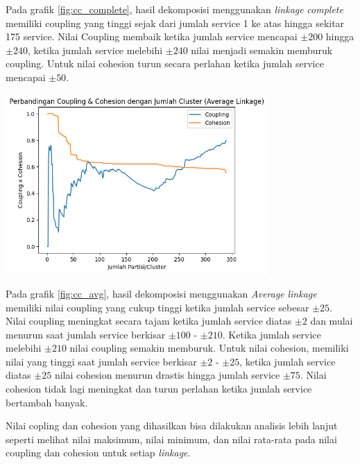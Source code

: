 Pada grafik \ref{fig:cc_complete}, hasil dekomposisi menggunakan \textit{linkage} \textit{complete} memiliki coupling yang tinggi sejak dari jumlah service 1 ke atas hingga sekitar 175 service. Nilai Coupling membaik ketika jumlah service mencapai   $\pm 200$  hingga  $\pm 240$, ketika jumlah service melebihi  $\pm 240$ nilai menjadi semakin memburuk coupling. Untuk nilai cohesion turun secara perlahan ketika jumlah service mencapai  $\pm 50$.

\begin{center}
	\includegraphics[width=10cm]{img/bab_4/cc_avg.png}
	\label{fig:cc_avg}
\end{center}

Pada grafik \ref{fig:cc_avg}, hasil dekomposisi menggunakan \textit{Average} \textit{linkage} memiliki nilai coupling yang cukup tinggi ketika jumlah service sebesar  $\pm 25$. Nilai coupling meningkat secara tajam ketika jumlah service diatas  $\pm 2$ dan mulai menurun saat jumlah service berkisar  $\pm 100$ - $\pm 210$. Ketika jumlah service melebihi  $\pm 210$ nilai coupling semakin memburuk. Untuk nilai cohesion, memiliki nilai yang tinggi saat jumlah service berkisar  $\pm 2$ -  $\pm 25$, ketika jumlah service diatas  $\pm 25$ nilai cohesion menurun drastis hingga jumlah service  $\pm 75$. Nilai cohesion tidak lagi meningkat dan turun perlahan ketika jumlah service bertambah banyak.

Nilai copling dan cohesion yang dihasilkan bisa dilakukan analisis lebih lanjut seperti melihat nilai maksimum, nilai minimum, dan nilai rata-rata pada nilai coupling dan cohesion untuk setiap \textit{linkage}.

